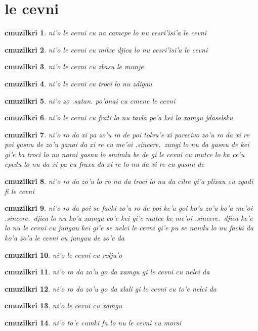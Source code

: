 \documentclass{report}
\newtheorem{cmuzilkri}{cmuzilkri}
\begin{document}
\section{le cevni}
\begin{cmuzilkri}
	ni'o le cevni cu na camcpe lo nu cesri'isi'a le cevni
\end{cmuzilkri}
\begin{cmuzilkri}
	ni'o le cevni cu milxe djica lo nu cesri'isi'a le cevni
\end{cmuzilkri}
\begin{cmuzilkri}
	ni'o le cevni cu zbasu le munje
\end{cmuzilkri}
\begin{cmuzilkri}
	ni'o le cevni cu troci lo nu zdigau
\end{cmuzilkri}
\begin{cmuzilkri}
	ni'o zo .satan. po'onai cu cmene le cevni
\end{cmuzilkri}
\begin{cmuzilkri}
	ni'o le cevni cu frati lo nu tavla pe'a kei lo xamgu jdaselsku
\end{cmuzilkri}
\begin{cmuzilkri}
	ni'o ro da xi pa zo'u ro de poi tolvu'e xi parecivo zo'u ro da xi re poi gasnu de zo'u ganai da xi re cu me'oi .sincere.\ zungi lo nu da gasnu de kei gi'e ba troci lo nu noroi gasnu lo smimlu be de gi le cevni cu mutce lo ka ce'u cpedu lo nu da xi pa cu fraxu da xi re lo nu da xi re cu gasnu de
\end{cmuzilkri}
\begin{cmuzilkri}
	ni'o ro da zo'u lo ro nu da troci lo nu da cilre gi'a plixau cu zgadi fi le cevni
\end{cmuzilkri}
\begin{cmuzilkri}
	ni'o ro da poi se facki zo'u ro de poi ke'a goi ko'a zo'u ko'a me'oi .sincere.\ djica lo nu ko'a xamgu co'e kei gi'e mutce ke me'oi .sincere.\ djica ke'e lo nu le cevni cu jungau kei gi'e se nelci le cevni gi'e pu se nandu lo nu facki da ko'a zo'u le cevni cu jungau de zo'e da
\end{cmuzilkri}
\begin{cmuzilkri}
	ni'o le cevni cu rolju'o
\end{cmuzilkri}
\begin{cmuzilkri}
	ni'o ro da zo'u go da xamgu gi le cevni cu nelci da
\end{cmuzilkri}
\begin{cmuzilkri}
	ni'o ro da zo'u go da xlali gi le cevni cu to'e nelci da
\end{cmuzilkri}
\begin{cmuzilkri}
	ni'o le cevni cu xamgu
\end{cmuzilkri}
\begin{cmuzilkri}
	ni'o to'e cumki fa lo nu le cevni cu morsi
\end{cmuzilkri}
\end{document}
